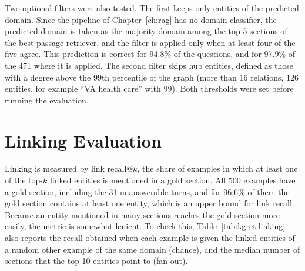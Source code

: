 Two optional filters were also tested. The first keeps only entities of the predicted
domain. Since the pipeline of Chapter~\ref{ch:rag} has no domain classifier, the
predicted domain is taken as the majority domain among the top-5 sections of the best
passage retriever, and the filter is applied only when at least four of the five agree.
This prediction is correct for 94.8\% of the questions, and for 97.9\% of the 471 where
it is applied. The second filter skips hub entities, defined as those with a degree
above the 99th percentile of the graph (more than 16 relations, 126 entities, for
example ``VA health care'' with 99). Both thresholds were set before running the
evaluation.


\section{Linking Evaluation}\label{sec:kgret:linkeval}

Linking is measured by link recall@$k$, the share of examples in which at least one of
the top-$k$ linked entities is mentioned in a gold section. All 500 examples have a gold
section, including the 31 unanswerable turns, and for 96.6\% of them the gold section
contains at least one entity, which is an upper bound for link recall. Because an entity
mentioned in many sections reaches the gold section more easily, the metric is somewhat
lenient. To check this, Table~\ref{tab:kgret:linking} also reports the recall obtained
when each example is given the linked entities of a random other example of the same
domain (chance), and the median number of sections that the top-10 entities point to
(fan-out).

